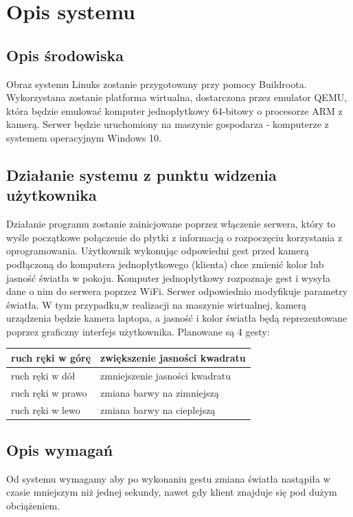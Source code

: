 \documentclass{article}
\begin{document}
\section{Opis systemu}
\subsection{Opis środowiska}
Obraz systemu Linuks zostanie przygotowany przy pomocy Buildroota. Wykorzystana zostanie platforma wirtualna, dostarczona przez emulator QEMU, która będzie emulować komputer jednopłytkowy 64-bitowy o procesorze ARM z kamerą. Serwer będzie uruchomiony na maszynie gospodarza - komputerze z systemem operacyjnym Windows 10. 
\subsection{Działanie systemu z punktu widzenia użytkownika}
Działanie programu zostanie zainicjowane poprzez włączenie serwera, który to wyśle początkowe połączenie do płytki z informacją o rozpoczęciu korzystania z oprogramowania. Użytkownik wykonując odpowiedni gest przed kamerą podłączoną do komputera jednopłytkowego (klienta) chce zmienić kolor lub jasność światła w pokoju. Komputer jednopłytkowy rozpoznaje gest i wysyła dane o nim do serwera poprzez WiFi. Serwer odpowiednio modyfikuje parametry światła. W tym przypadku,w realizacji na maszynie wirtualnej, kamerą urządzenia będzie kamera laptopa, a jasność i kolor światła będą reprezentowane poprzez graficzny interfejs użytkownika. Planowane są 4 gesty:
\begin{table}[H]
\begin{tabular}{|l|l|}
\hline
ruch ręki w górę  & zwiększenie jasności kwadratu  \\ \hline
ruch ręki w dół   & zmniejszenie jasności kwadratu \\ \hline
ruch ręki w prawo & zmiana barwy na zimniejszą     \\ \hline
ruch ręki w lewo  & zmiana barwy na cieplejszą     \\ \hline
\end{tabular}
\centering
\end{table}
\subsection{Opis wymagań}
Od systemu wymagamy aby po wykonaniu gestu zmiana światła nastąpiła w czasie mniejszym niż jednej sekundy, nawet gdy klient znajduje się pod dużym obciążeniem.
\end{document}
